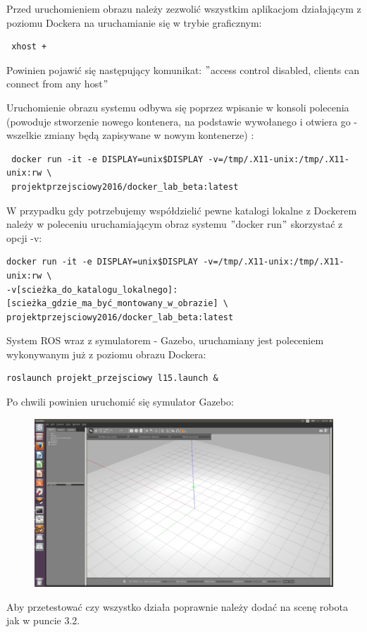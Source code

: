 \documentclass[10pt, a4paper]{article}
\begin{document}
Przed uruchomieniem obrazu należy zezwolić wszystkim aplikacjom działającym z poziomu Dockera na uruchamianie się w trybie graficznym:
\begin{verbatim}
 xhost +
\end{verbatim}

Powinien pojawić się następujący komunikat:
$"$access control disabled, clients can connect from any host$"$

Uruchomienie obrazu systemu odbywa się poprzez wpisanie w konsoli polecenia (powoduje stworzenie nowego kontenera, na podstawie wywołanego i otwiera go - wszelkie zmiany będą zapisywane w nowym kontenerze) :

\begin{verbatim}
 docker run -it -e DISPLAY=unix$DISPLAY -v=/tmp/.X11-unix:/tmp/.X11-unix:rw \
 projektprzejsciowy2016/docker_lab_beta:latest

\end{verbatim}

W przypadku gdy potrzebujemy współdzielić pewne katalogi lokalne z Dockerem należy  w poleceniu uruchamiającym obraz systemu $"$docker run$"$ skorzystać z opcji -v:
\begin{verbatim}
docker run -it -e DISPLAY=unix$DISPLAY -v=/tmp/.X11-unix:/tmp/.X11-unix:rw \
-v[scieżka_do_katalogu_lokalnego]:[scieżka_gdzie_ma_być_montowany_w_obrazie] \
projektprzejsciowy2016/docker_lab_beta:latest

\end{verbatim}


System ROS wraz z symulatorem - Gazebo, uruchamiany jest poleceniem wykonywanym już z poziomu obrazu Dockera:
\begin{verbatim}
roslaunch projekt_przejsciowy l15.launch &
\end{verbatim} 

Po chwili powinien uruchomić się symulator Gazebo:

\begin{figure}[hbt]
  \setlength{\unitlength}{1.0cm}
  \centering 
  
    \includegraphics[width=12 cm]{./grafika/EkranGlowny.png}

\end{figure}
 Aby przetestować czy wszystko działa poprawnie należy dodać na scenę robota jak w puncie 3.2.
\end{document}
